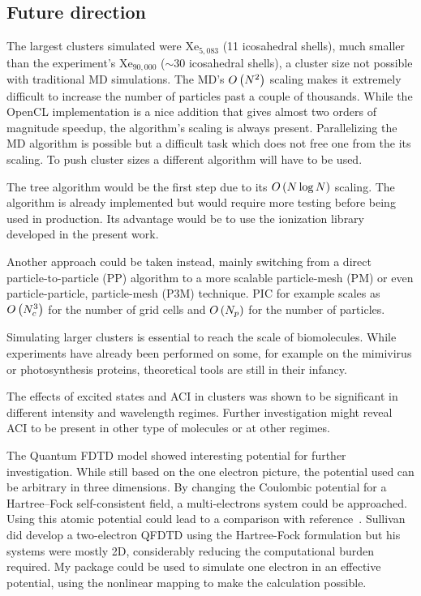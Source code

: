 \subsection{Future direction}

The largest clusters simulated were Xe$_{5,083}$ (11
icosahedral shells), much smaller than the experiment's Xe$_{90,000}$
($\sim$30 icosahedral shells), a cluster size not possible with traditional
MD simulations. The MD's $O\left( N^2 \right)$ scaling makes it extremely difficult
to increase the number of particles past a couple of thousands. While
the OpenCL implementation is a nice addition that gives almost two orders
of magnitude speedup, the algorithm's scaling is always present.
Parallelizing the MD algorithm is possible but a difficult task which does
not free one from the its scaling. To push cluster sizes a different
algorithm will have to be used.

The tree algorithm would be the first step due to its $O\left( N \log N \right)$ scaling.
The algorithm is already implemented but would require more testing
before being used in production. Its advantage would be to use the
ionization library developed in the present work.

Another approach could be taken instead,
mainly switching from a direct particle-to-particle (PP) algorithm to a more
scalable particle-mesh (PM) or even particle-particle, particle-mesh (P3M)
technique. PIC for example scales as $O\left( N_c^3 \right)$ for the number of grid cells and
$O\left( N_p \right)$ for the number of particles.

Simulating larger clusters is essential to reach the scale of biomolecules.
While experiments have already been performed on some, for example
on the mimivirus or photosynthesis proteins, theoretical tools are still
in their infancy.

The effects of excited states and ACI in clusters was shown to be significant
in different intensity and wavelength regimes. Further investigation might
reveal ACI to be present in other type of molecules or at other regimes.

The Quantum FDTD model showed interesting potential for further investigation.
While still based on the one electron picture, the potential used can
be arbitrary in three dimensions. By changing the Coulombic potential
for a Hartree–Fock self-consistent field, a multi-electrons system
could be approached. Using this atomic potential could lead to a comparison
with reference~\cite{Walters2006}.
Sullivan did develop a two-electron QFDTD using the
Hartree-Fock formulation but his systems were mostly 2D, considerably reducing
the computational burden required. My package could be used to simulate one
electron in an effective potential, using the nonlinear mapping to make the
calculation possible.

